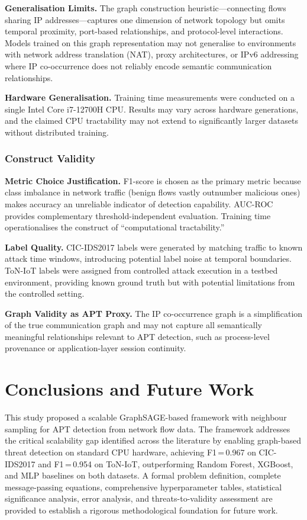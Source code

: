 \documentclass[conference]{IEEEtran}
\begin{document}
\textbf{Generalisation Limits.} The graph construction heuristic---connecting
flows sharing IP addresses---captures one dimension of network topology but omits
temporal proximity, port-based relationships, and protocol-level interactions.
Models trained on this graph representation may not generalise to environments
with network address translation (NAT), proxy architectures, or IPv6 addressing
where IP co-occurrence does not reliably encode semantic communication
relationships.

\textbf{Hardware Generalisation.} Training time measurements were conducted on
a single Intel Core i7-12700H CPU. Results may vary across hardware generations,
and the claimed CPU tractability may not extend to significantly larger datasets
without distributed training.

\subsubsection{Construct Validity}

\textbf{Metric Choice Justification.} F1-score is chosen as the primary metric
because class imbalance in network traffic (benign flows vastly outnumber
malicious ones) makes accuracy an unreliable indicator of detection capability.
AUC-ROC provides complementary threshold-independent evaluation. Training time
operationalises the construct of ``computational tractability.''

\textbf{Label Quality.} CIC-IDS2017 labels were generated by matching traffic
to known attack time windows, introducing potential label noise at temporal
boundaries. ToN-IoT labels were assigned from controlled attack execution in a
testbed environment, providing known ground truth but with potential limitations
from the controlled setting.

\textbf{Graph Validity as APT Proxy.} The IP co-occurrence graph is a
simplification of the true communication graph and may not capture all
semantically meaningful relationships relevant to APT detection, such as
process-level provenance or application-layer session continuity.

\section{Conclusions and Future Work}

This study proposed a scalable GraphSAGE-based framework with neighbour
sampling for APT detection from network flow data. The framework addresses the
critical scalability gap identified across the literature by enabling
graph-based threat detection on standard CPU hardware, achieving F1\,=\,0.967
on CIC-IDS2017 and F1\,=\,0.954 on ToN-IoT, outperforming Random Forest,
XGBoost, and MLP baselines on both datasets. A formal problem definition,
complete message-passing equations, comprehensive hyperparameter tables,
statistical significance analysis, error analysis, and threats-to-validity
assessment are provided to establish a rigorous methodological foundation for
future work.
\end{document}
